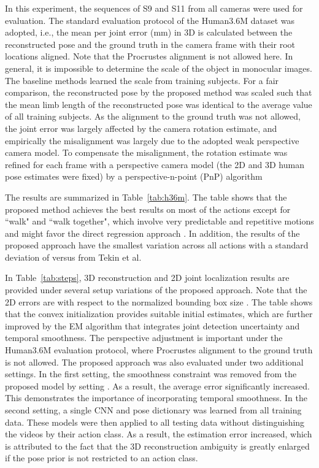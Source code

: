 \documentclass[10pt,twocolumn,letterpaper]{article}
\newcommand{\refTab}[1]{Table~\ref{#1}}
\begin{document}
{In this experiment, the sequences of S9 and S11 from all cameras were used for evaluation. The standard evaluation protocol of the Human3.6M dataset was adopted, i.e., the mean per joint error (mm) in 3D is calculated between the reconstructed pose and the ground truth in the camera frame with their root locations aligned. Note that the Procrustes alignment is not allowed here. In general, it is impossible to determine the scale of the object in monocular images. The baseline methods learned the scale from training subjects.  For a fair comparison, the reconstructed pose by the proposed method was scaled such that the mean limb length of the reconstructed pose was identical to the average value of all training subjects. As the alignment to the ground truth was not allowed, the joint error was largely affected by the camera rotation estimate, and empirically the misalignment was largely due to the adopted weak perspective camera model. To compensate the misalignment, the rotation estimate was refined for each frame with a perspective camera model (the 2D and 3D human pose estimates were fixed) by a perspective-n-point (PnP) algorithm \cite{lu2000fast}

The results are summarized in \refTab{tab:h36m}. The table shows that the proposed method achieves the best results on most of the actions except for ``walk" and ``walk together", which involve very predictable and repetitive motions and might favor the direct regression approach \cite{tekin2015predicting}. In addition, the results of the proposed approach have the smallest variation across all actions with a standard deviation of   versus  from Tekin et al.

In \refTab{tab:steps},  3D reconstruction and 2D joint localization results are provided under several setup variations of the proposed approach.
Note that the 2D errors are with respect to the normalized bounding box size . The table shows that the convex initialization provides suitable initial estimates, which are further improved by the EM algorithm that integrates joint detection uncertainty and temporal smoothness. The perspective adjustment is important under the Human3.6M evaluation protocol, where Procrustes alignment to the ground truth is not allowed.  The proposed approach was also evaluated under two additional settings.
In the first setting, the smoothness constraint was removed from the proposed model by setting .  As a result, the average error significantly increased.
This demonstrates the importance of incorporating temporal smoothness. In the second setting, a single CNN and pose dictionary was learned from all training data.  These models were then applied
to all testing data without distinguishing the videos by their action class.
As a result, the estimation error increased, which is attributed to the fact that the 3D reconstruction ambiguity is greatly enlarged if the pose prior is not restricted to an action class.

}
\end{document}
